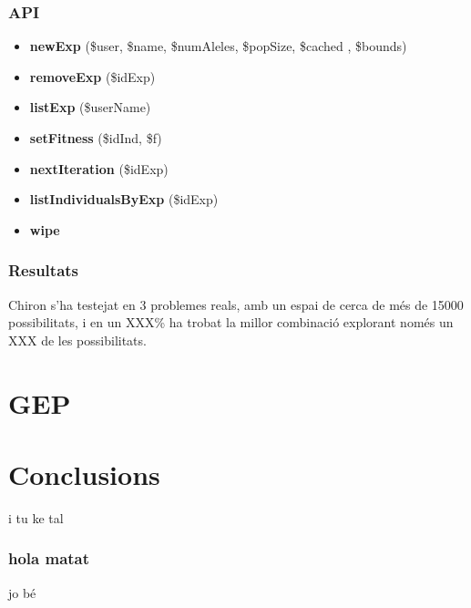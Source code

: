 \documentclass{beamer}
\begin{document}
\begin{frame}
	\frametitle{API}
	\begin{itemize}
		\item \textbf{newExp} (\$user, \$name, \$numAleles, \$popSize, \$cached , \$bounds)
		\item \textbf{removeExp} (\$idExp)
		\item \textbf{listExp} (\$userName)
		\item \textbf{setFitness} (\$idInd, \$f)
		\item \textbf{nextIteration} (\$idExp)
		\item \textbf{listIndividualsByExp} (\$idExp)
		\item \textbf{wipe}
	\end{itemize}
\end{frame}

\begin{frame}
\frametitle{Resultats}
Chiron s'ha testejat en 3 problemes reals, amb un espai de cerca de més de 15000
possibilitats, i en un XXX\% ha trobat la millor combinació explorant només un
XXX de les possibilitats.
\end{frame}

\section{GEP} %
\label{sec:GEP}

\section{Conclusions} %
\label{sec:Conclusions}
\begin{frame}
	i tu ke tal
\end{frame}

\subsubsection{hola matat} %
\label{ssub:hola matat}
\begin{frame}
	jo bé
\end{frame}


\end{document}

